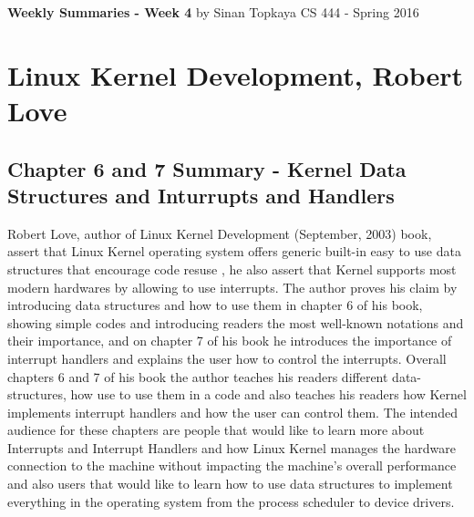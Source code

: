 \documentclass[letterpaper,10pt,draftclsnofoot,onecolumn]{IEEEtran}
\begin{document}
\begin{titlepage}
	
	\begin{center}
	\bigbreak
	\textbf{Weekly Summaries - Week 4}
	\bigbreak
	by Sinan Topkaya
	\smallbreak
	CS 444 - Spring 2016
	\end{center}
\end{titlepage}
	
\section*{Linux Kernel Development, Robert Love}
\subsection*{Chapter 6 and 7 Summary - Kernel Data Structures and Inturrupts and Handlers}

Robert Love, author of Linux Kernel Development (September, 2003) book, assert that Linux Kernel operating system offers generic built-in easy to use data structures that encourage code resuse , he also assert that Kernel supports most modern hardwares by allowing to use interrupts. The author proves his claim by introducing data structures and how to use them in chapter 6 of his book, showing simple codes and introducing readers the most well-known notations and their importance, and on chapter 7 of his book he introduces the importance of interrupt handlers and explains the user how to control the interrupts. Overall chapters 6 and 7 of his book the author teaches his readers different data-structures, how use to use them in a code and also teaches his readers how Kernel implements interrupt handlers and how the user can control them. The intended audience for these chapters are people that would like to learn more about Interrupts and Interrupt Handlers and how Linux Kernel manages the hardware connection to the machine without impacting the machine’s overall performance and also users that would like to learn how to use data structures to implement everything in the operating system from the process scheduler to device drivers.
\end{document}
